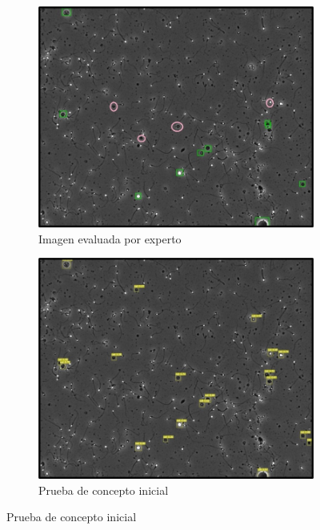 \documentclass[12pt,a4paper,onecolumn,oneside]{report}
\begin{document}
\begin{figure}[H]
  \centering
  \begin{subfigure}[b]{0.48\textwidth}
    \centering
    \includegraphics[width=\textwidth]{figuras/evaluacion_cualitativa/9/9.jpg}
    \caption{Imagen evaluada por experto}
    \label{fig:exp_image_9}
  \end{subfigure}
  \hfill
  \begin{subfigure}[b]{0.48\textwidth}
    \centering
    \includegraphics[width=\textwidth]{figuras/evaluacion_cualitativa/9/9_v7.jpg}
    \caption{Prueba de concepto inicial}
    \label{fig:poc_image_9}
  \end{subfigure}
  

\end{figure}
\end{document}
